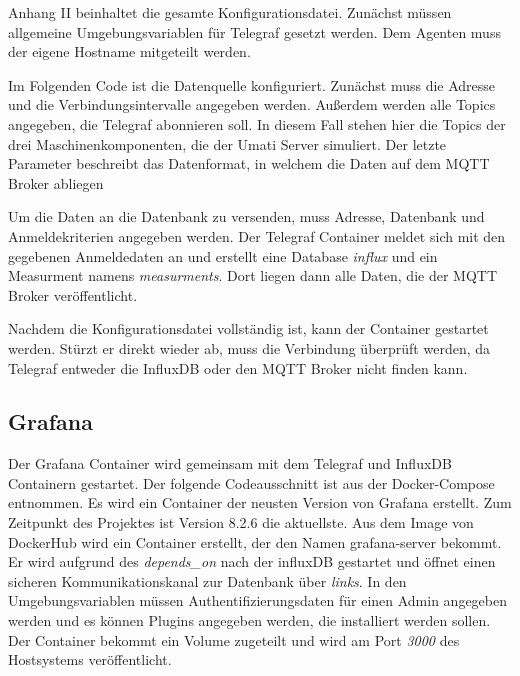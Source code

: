 \documentclass[a4paper, 12pt, oneside, toc=listofnumbered, bibliography=totoc]{scrbook}
\begin{document}
			Anhang II beinhaltet die gesamte Konfigurationsdatei. Zunächst müssen allgemeine Umgebungsvariablen für Telegraf gesetzt werden. Dem Agenten muss der eigene Hostname mitgeteilt werden. 
			
			
			
			Im Folgenden Code ist die Datenquelle konfiguriert. Zunächst muss die Adresse und die Verbindungsintervalle angegeben werden. Außerdem werden alle Topics angegeben, die Telegraf abonnieren soll. In diesem Fall stehen hier die Topics der drei Maschinenkomponenten, die der Umati Server simuliert. Der letzte Parameter beschreibt das Datenformat, in welchem die Daten auf dem MQTT Broker abliegen
			
			
			
			Um die Daten an die Datenbank zu versenden, muss Adresse, Datenbank und Anmeldekriterien angegeben werden. Der Telegraf Container meldet sich mit den gegebenen Anmeldedaten an und erstellt eine Database \textit{influx} und ein Measurment namens \textit{measurments}. Dort liegen dann alle Daten, die der MQTT Broker veröffentlicht. 
			
			
			
			Nachdem die Konfigurationsdatei vollständig ist, kann der Container gestartet werden. Stürzt er direkt wieder ab, muss die Verbindung überprüft werden, da Telegraf entweder die InfluxDB oder den MQTT Broker nicht finden kann.
		
		\subsection{Grafana}
		
		Der Grafana Container wird gemeinsam mit dem Telegraf und InfluxDB Containern gestartet. Der folgende Codeausschnitt ist aus der Docker-Compose entnommen. Es wird ein Container der neusten Version von Grafana erstellt. Zum Zeitpunkt des Projektes ist Version 8.2.6 die aktuellste. Aus dem Image von DockerHub wird ein Container erstellt, der den Namen grafana-server bekommt. Er wird aufgrund des \textit{depends\_on} nach der influxDB gestartet und öffnet einen sicheren Kommunikationskanal zur Datenbank über \textit{links}. In den Umgebungsvariablen müssen Authentifizierungsdaten für einen Admin angegeben werden und es können Plugins angegeben werden, die installiert werden sollen. Der Container bekommt ein Volume zugeteilt und wird am Port \textit{3000} des Hostsystems veröffentlicht. 
		
\end{document}
